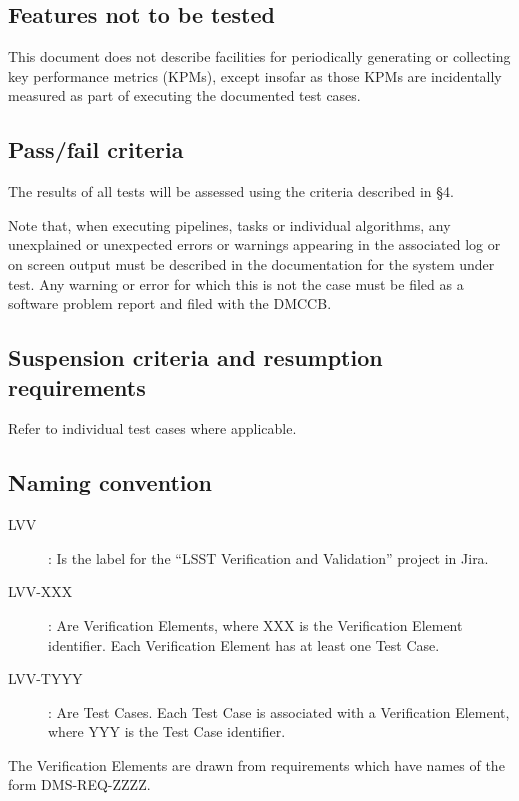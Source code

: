 \documentclass[DM,lsstdraft,STS,toc]{lsstdoc}
\begin{document}
\subsection{Features not to be tested}
\label{sec:featnot2test}

This document does not describe facilities for periodically generating or collecting key performance metrics (KPMs),
except insofar as those KPMs are incidentally measured as part of executing the documented test cases.

\subsection{Pass/fail criteria}
\label{sec:passfail}

The results of all tests will be assessed using the criteria described in
 \S4.

Note that, when executing pipelines, tasks or individual algorithms, any unexplained or unexpected errors or warnings
appearing in the associated log or on screen output must be described in the documentation for the system under test.
Any warning or error for which this is not the case must be filed as a software problem report and filed with the DMCCB.


\subsection{Suspension criteria and resumption requirements}
\label{suspension}

Refer to individual test cases where applicable.

\subsection{Naming convention}

\begin{description}
  \item[LVV]{: Is the label for the ``LSST Verification and Validation'' project in Jira.}
  \item[LVV-XXX]{: Are Verification Elements, where XXX is the Verification Element identifier.  Each Verification Element has at least one Test Case. }
  \item[LVV-TYYY]{: Are Test Cases. Each Test Case is associated with a Verification Element, where YYY is the Test Case identifier.}
\end{description}

The Verification Elements are drawn from  requirements which have names of the form DMS-REQ-ZZZZ.

\newpage

\end{document}
